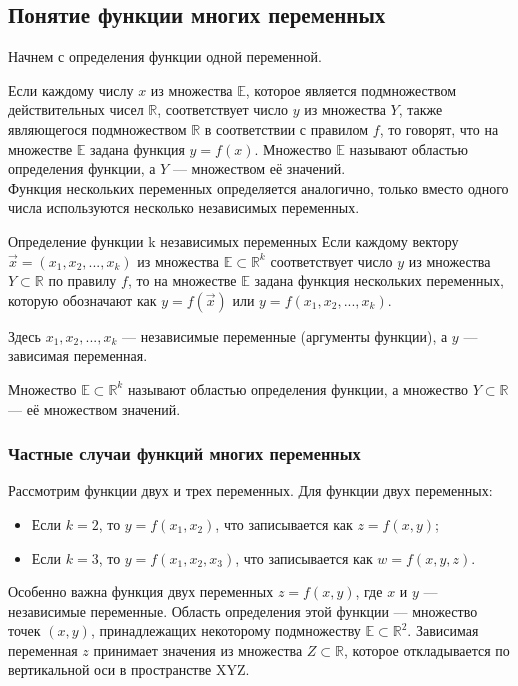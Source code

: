 \subsection{Понятие функции многих переменных} \label{sec:1.2}

Начнем с определения функции одной переменной.

Если каждому числу $x$ из множества $\mathbb{E}$, которое является подмножеством действительных чисел $\mathbb{R}$, соответствует число $y$ из множества $Y$, также являющегося подмножеством $\mathbb{R}$ в соответствии с правилом $f$, то говорят, что на множестве $\mathbb{E}$ задана функция $y = f(x)$. Множество $\mathbb{E}$ называют областью определения функции, а $Y$ — множеством её значений.\\

Функция нескольких переменных определяется аналогично, только вместо одного числа используются несколько независимых переменных.

\begin{tbox*}{Определение функции k независимых переменных}
	Если каждому вектору $\vec{x} = (x_1, x_2, ..., x_k)$ из множества $\mathbb{E} \subset \mathbb{R}^k$ соответствует число $y$ из множества $Y \subset \mathbb{R}$ по правилу $f$, то на множестве $\mathbb{E}$ задана функция нескольких переменных, которую обозначают как $y = f(\vec{x})$ или $y = f(x_1, x_2, ..., x_k)$.

	Здесь $x_1, x_2, ..., x_k$ — независимые переменные (аргументы функции), а $y$ — зависимая переменная.

	Множество $\mathbb{E} \subset \mathbb{R}^k$ называют областью определения функции, а множество $Y \subset \mathbb{R}$ — её множеством значений.
\end{tbox*}

\subsubsection{Частные случаи функций многих переменных}
Рассмотрим функции двух и трех переменных. Для функции двух переменных:

\begin{itemize}
	\item Если $k=2$, то $y = f(x_1, x_2)$, что записывается как $z = f(x, y)$;
	\item Если $k=3$, то $y = f(x_1, x_2, x_3)$, что записывается как $w = f(x, y, z)$.
\end{itemize}

Особенно важна функция двух переменных $z = f(x, y)$, где $x$ и $y$ — независимые переменные. Область определения этой функции — множество точек $(x, y)$, принадлежащих некоторому подмножеству $\mathbb{E} \subset \mathbb{R}^2$. Зависимая переменная $z$ принимает значения из множества $Z \subset \mathbb{R}$, которое откладывается по вертикальной оси в пространстве XYZ.

